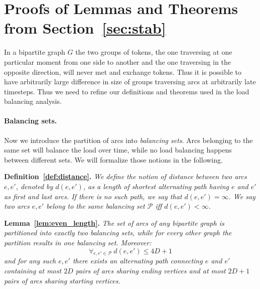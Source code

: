 \documentclass{article}[11pt,letter]
\begin{document}
\newpage
\section{Proofs of Lemmas and Theorems from Section~\ref{sec:stab}}
\label{appendix:sec4}
In a bipartite graph $G$ the two groups of tokens, the one traversing at one particular moment from one side to another and the one traversing in the opposite direction, will never met and exchange tokens. Thus it is possible to have arbitrarily large difference in size of groups traversing arcs at arbitrarily late timesteps. Thus we need to refine our definitions and theorems used in the load balancing analysis.

\paragraph{Balancing sets.} Now we introduce the partition of arcs into \emph{balancing sets}. Arcs belonging to the same set will balance the load over time, while no load balancing happens between different sets. We will formalize those notions in the following.

\noindent\textbf{Definition~\ref{def:distance}.}
\emph{We define the notion of \emph{distance} between two arcs $e,e'$, denoted by $d(e,e')$, as a length of shortest alternating path having $e$ and $e'$ as first and last arcs. If there is no such path, we say that $d(e,e') = \infty$.
We say two arcs $e,e'$  belong to the same \emph{balancing set} $\mathcal{P}$ iff  $d(e,e') < \infty$.}


\noindent\textbf{Lemma~\ref{lem:even_length}.}
\emph{The set of arcs of any bipartite graph is partitioned into exactly two balancing sets, while for every other graph the partition results in one balancing set. Moreover:
$$\forall_{e,e' \in \mathcal{P}} \ d(e,e') \le 4D+1$$
and for any such $e,e'$ there exists an alternating path connecting $e$ and $e'$ containing at most $2D$ pairs of arcs sharing ending vertices and at most $2D+1$ pairs of arcs sharing starting vertices.}
\end{document}
